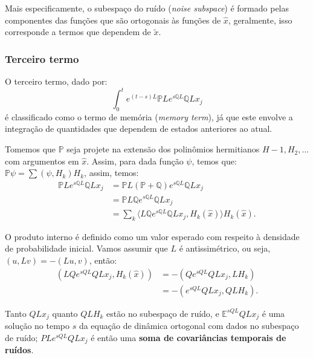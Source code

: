 \documentclass[12pt]{article}
\begin{document}
Mais especificamente, o subespaço do ruído (\textit{noise subspace}) é formado pelas componentes das funções que são ortogonais às funções de $\hat{x}$, geralmente, isso corresponde a termos que dependem de $\tilde{x}$. 

\subsubsection{Terceiro termo}
O terceiro termo, dado por:
\begin{equation*}
	\int_0^t e^{(t-s)L} \mathbb{P}L e^{s\mathbb{Q}L} \mathbb{Q}L x_j
\end{equation*}
é classificado como o termo de memória  (\textit{memory term}), já que este envolve a integração de quantidades que dependem de estados anteriores ao atual.

Tomemos que $\mathbb{P}$ seja projete na extensão dos polinômios hermitianos $H-1, H_2, \ldots$ com argumentos em $\hat{x}$. Assim, para dada função $\psi$, temos que: $\mathbb{P}\psi = \sum (\psi, H_k)H_k$, assim, temos:
\begin{align*}
	\mathbb{P}Le^{s\mathbb{Q}L} \mathbb{Q}Lx_j &= \mathbb{P}L(\mathbb{P} + \mathbb{Q})e^{s\mathbb{Q}L} \mathbb{Q}Lx_j\\
	                                           &= \mathbb{P}L\mathbb{Q}e^{s\mathbb{Q}L} \mathbb{Q}Lx_j\\
	                                           &= \sum_k \langle L\mathbb{Q}e^{s\mathbb{Q}L} \mathbb{Q}Lx_j, H_k(\hat{x}) \rangle H_k(\hat{x}). 
\end{align*}

O produto interno é definido como um valor esperado com respeito à densidade de probabilidade inicial. Vamos assumir que $L$ é antissimétrico, ou seja, $(u, Lv) = -(Lu, v)$, então:
\begin{align*}
	(L Q e^{s Q L} Q L x_j, H_k(\hat{x})) 
	  & = - (Q e^{s Q L} Q L x_j, L H_k)  \\
	  & = - (e^{s Q L} Q L x_j, Q L H_k). 
\end{align*}

Tanto $Q L x_j$ quanto $Q L H_k$ estão no subespaço de ruído, e $\mathbb{E}^{s Q L} Q L x_j$ é uma solução no tempo $s$ da equação de dinâmica ortogonal com dados no subespaço de ruído; $P L e^{s Q L} Q L x_j$ é então uma \textbf{soma de covariâncias temporais de ruídos}.




\newpage
\nocite{*}
\printbibliography
\end{document}
